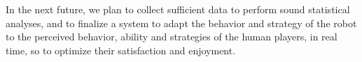 In the next future, we plan to collect sufficient data to perform sound statistical analyses, and to finalize a system to adapt the behavior and strategy of the robot to the perceived behavior, ability and strategies of the human players, in real time, so to optimize their satisfaction and enjoyment. 